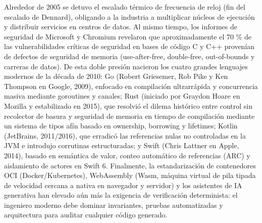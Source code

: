 \documentclass{book}
\begin{document}
Alrededor de 2005 se detuvo el escalado térmico de frecuencia de reloj (fin del escalado de Dennard), obligando a la industria a multiplicar núcleos de ejecución y distribuir servicios en centros de datos. Al mismo tiempo, los informes de seguridad de Microsoft y Chromium revelaron que aproximadamente el 70 \% de las vulnerabilidades críticas de seguridad en bases de código C y C++ provenían de defectos de seguridad de memoria (use-after-free, double-free, out-of-bounds y carreras de datos).
De esta doble presión nacieron los cuatro grandes lenguajes modernos de la década de 2010: Go (Robert Griesemer, Rob Pike y Ken Thompson en Google, 2009), enfocado en compilación ultrarrápida y concurrencia masiva mediante goroutines y canales; Rust (iniciado por Graydon Hoare en Mozilla y estabilizado en 2015), que resolvió el dilema histórico entre control sin recolector de basura y seguridad de memoria en tiempo de compilación mediante un sistema de tipos afín basado en ownership, borrowing y lifetimes; Kotlin (JetBrains, 2011/2016), que erradicó las referencias nulas no controladas en la JVM e introdujo corrutinas estructuradas; y Swift (Chris Lattner en Apple, 2014), basado en semántica de valor, conteo automático de referencias (ARC) y aislamiento de actores en Swift 6. Finalmente, la estandarización de contenedores OCI (Docker/Kubernetes), WebAssembly (Wasm, máquina virtual de pila tipada de velocidad cercana a nativa en navegador y servidor) y los asistentes de IA generativa han elevado aún más la exigencia de verificación determinista: el ingeniero moderno debe dominar invariantes, pruebas automatizadas y arquitectura para auditar cualquier código generado.
\end{document}

